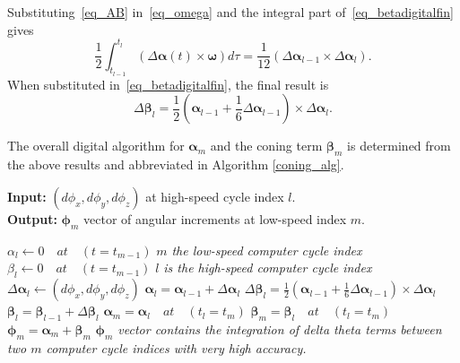 \documentclass[journal]{IEEEtran}
\begin{document}
Substituting~\eqref{eq_AB} in~\eqref{eq_omega} and the integral part of~\eqref{eq_betadigitalfin} gives
\begin{equation}
\frac{1}{2} \int_{t_{l-1}}^{t_l}\left(\Delta\boldsymbol{\alpha}(t)\times\boldsymbol{\omega}\right)d\tau = \frac{1}{12} \left(\Delta\boldsymbol{\alpha}_{l-1}\times\Delta\boldsymbol{\alpha}_{l}\right).
\end{equation}
When substituted in~\eqref{eq_betadigitalfin}, the final result is
\begin{equation}
\Delta\boldsymbol{\beta}_l =\frac{1}{2}\left(\boldsymbol{\alpha}_{l-1}+\frac{1}{6}\Delta\boldsymbol{\alpha}_{l-1}\right)\times \Delta\boldsymbol{\alpha}_l.
\end{equation}

The overall digital algorithm for $\boldsymbol{\alpha}_m$ and the coning term $\boldsymbol{\beta}_m$ is determined from the above results and abbreviated in Algorithm \ref{coning_alg}. 

\begin{algorithm}[h]
\caption{Coning algorithm}\label{coning_alg}
 \hspace*{\algorithmicindent} \textbf{Input:} $({d\phi}_x, {d\phi}_y,{d\phi}_z)$ at high-speed cycle index $l$. \\
 \hspace*{\algorithmicindent} \textbf{Output:} $\boldsymbol{\phi}_m $ vector of angular increments at low-speed index $m$.
\begin{algorithmic}[1]
\State ${\alpha}_l \gets 0\quad at\quad (t=t_{m-1})$ \Comment \textit{$m$ the low-speed computer cycle index} 
\State ${\beta}_l \gets 0\quad at\quad (t=t_{m-1})$
\Comment \textit{$l$ is the high-speed computer cycle index  }
\State $\Delta\boldsymbol{\alpha}_l \gets ({d\phi}_x, {d\phi}_y,{d\phi}_z)$
\State $\boldsymbol{\alpha}_l = \boldsymbol{\alpha}_{l-1}+\Delta\boldsymbol{\alpha}_l$
\State $\Delta\boldsymbol{\beta}_l =\frac{1}{2}\left(\boldsymbol{\alpha}_{l-1}+\frac{1}{6}\Delta\boldsymbol{\alpha}_{l-1}\right)\times \Delta\boldsymbol{\alpha}_l$
\State $\boldsymbol{\beta}_l = \boldsymbol{\beta}_{l-1}+\Delta\boldsymbol{\beta}_l$
\EndWhile
\State $\boldsymbol{\alpha}_m = \boldsymbol{\alpha}_l\quad at\quad (t_l=t_m)$
\State $\boldsymbol{\beta}_m = \boldsymbol{\beta}_l\quad at\quad (t_l=t_m) $
\State $\boldsymbol{\phi}_m =  \boldsymbol{\alpha}_m + \boldsymbol{\beta}_m$
\State \Comment \textit{$\boldsymbol{\phi}_m$ vector contains the integration of delta theta terms between two $m$ computer cycle indices with very high accuracy.}
\end{algorithmic}
\end{algorithm}
\end{document}
